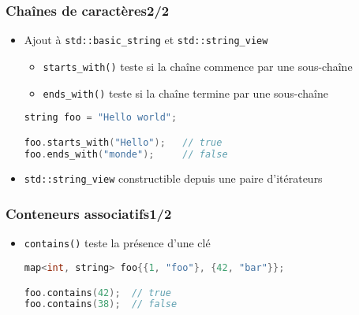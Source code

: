 \documentclass[C++.tex]{subfiles}
\begin{document}
\begin{frame}[fragile]
	\frametitle{Chaînes de caractères\titlehfill{}2/2}
	\begin{itemize}
		\item Ajout à \lstinline|std::basic_string| et \lstinline|std::string_view|
		\begin{itemize}
			\item \lstinline|starts_with()| teste si la chaîne commence par une sous-chaîne
			\item \lstinline|ends_with()| teste si la chaîne termine par une sous-chaîne
		\end{itemize}

		\begin{lstlisting}[language=C++]
string foo = "Hello world";

foo.starts_with("Hello");   // true
foo.ends_with("monde");     // false\end{lstlisting}

		\item \lstinline|std::string_view| constructible depuis une paire d'itérateurs
	\end{itemize}
\end{frame}

\begin{frame}[fragile]
	\frametitle{Conteneurs associatifs\titlehfill{}1/2}
	\begin{itemize}
		\item \lstinline|contains()| teste la présence d'une clé


		\begin{lstlisting}[language=C++]
map<int, string> foo{{1, "foo"}, {42, "bar"}};

foo.contains(42);  // true
foo.contains(38);  // false\end{lstlisting}
	\end{itemize}
\end{frame}
\end{document}
